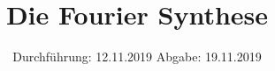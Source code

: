

\subject{V802}
\title{Die Fourier Synthese}
\date{%
  Durchführung: 12.11.2019
  \hspace{3em}
  Abgabe: 19.11.2019
}



\maketitle
\thispagestyle{empty}
\tableofcontents
\newpage






\printbibliography{}


